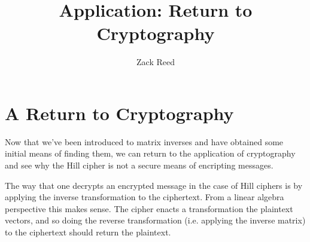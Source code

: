 \documentclass{ximera}
\author{Zack Reed}
\title{Application: Return to Cryptography}
\begin{document}
\begin{abstract}

\end{abstract}
\maketitle


\section*{A Return to Cryptography}

Now that we've been introduced to matrix inverses and have obtained some initial means of finding them, we can return to the application of cryptography and see why the Hill cipher is not a secure means of encripting messages.

The way that one decrypts an encrypted message in the case of Hill ciphers is by applying the inverse transformation to the ciphertext. From a linear algebra perspective this makes sense. The cipher enacts a transformation the plaintext vectors, and so doing the reverse transformation (i.e. applying the inverse matrix) to the ciphertext should return the plaintext.
\end{document}
